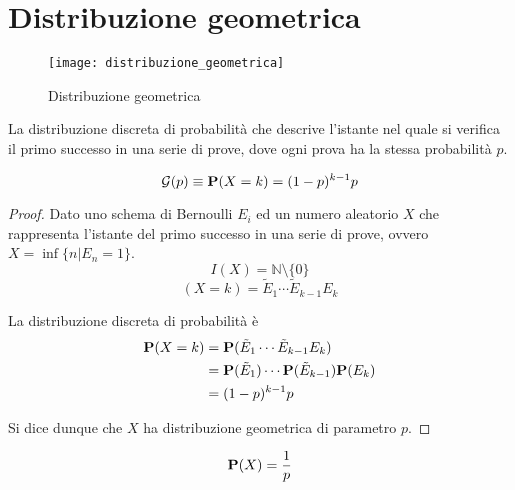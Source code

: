 
\section{Distribuzione geometrica} %
\begin{figure*}
  \texttt{[image: distribuzione\_geometrica]}
  \caption{Distribuzione geometrica}
\end{figure*}

\begin{definition}
  \label{def:distribuzione_geometrica}
  La distribuzione discreta di probabilità che descrive l'istante nel quale si verifica il primo successo in una serie di prove, dove ogni prova ha la stessa probabilità \( p \).

  \[ \mathcal{G}(p) \equiv \mathbf{P}(X = k) = (1-p)^{k-1} p \]
\end{definition}

\begin{proof}
  Dato uno schema di Bernoulli \( E_i \) ed un numero aleatorio \( X \) che rappresenta l'istante del primo successo in una serie di prove, ovvero \( X = \inf\{ n | E_n = 1 \} \).
  \[ I(X) = \mathbb{N} \setminus \{ 0 \} \]
  \[ (X = k) = \tilde{E}_1 \cdots \tilde{E}_{k-1} E_k \]

  La distribuzione discreta di probabilità è
  \begin{align*}
    \mathbf{P}(X = k) &= \mathbf{P}(\tilde{E}_1 \cdots \tilde{E}_{k-1} E_k) \\
    &= \mathbf{P}(\tilde{E}_1) \cdots \mathbf{P}(\tilde{E}_{k-1}) \mathbf{P}(E_k) \\
    &= (1-p)^{k-1} p
  \end{align*}

  Si dice dunque che \( X \) ha distribuzione geometrica di parametro \( p \).
\end{proof}

\begin{proposition}
  \[ \mathbf{P}(X) = \frac{1}{p} \]
\end{proposition}

